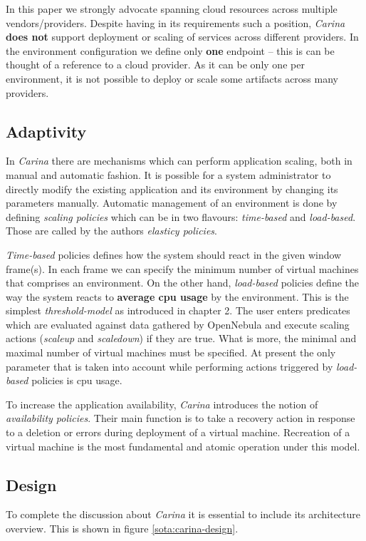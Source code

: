 In this paper we strongly advocate spanning cloud resources across multiple vendors/providers. Despite having in its requirements such a position, \emph{Carina} \textbf{does not} support deployment or scaling of services across different providers. In the environment configuration we define only \textbf{one} endpoint -- this is can be thought of a reference to a cloud provider. As it can be only one per environment, it is not possible to deploy or scale some artifacts across many providers.

\subsection{Adaptivity}
In \emph{Carina} there are mechanisms which can perform application scaling, both in manual and automatic fashion. It is possible for a system administrator to directly modify the existing application and its environment by changing its parameters manually. Automatic management of an environment is done by defining \emph{scaling policies} which can be in two flavours: \emph{time-based} and \emph{load-based}. Those are called by the authors \emph{elasticy policies}.

\emph{Time-based} policies defines how the system should react in the given window frame(s). In each frame we can specify the minimum number of virtual machines that comprises an environment. On the other hand, \emph{load-based} policies define the way the system reacts to \textbf{average cpu usage} by the environment. This is the simplest \emph{threshold-model} as introduced in chapter 2. The user enters predicates which are evaluated against data gathered by OpenNebula and execute scaling actions  (\emph{scaleup} and \emph{scaledown}) if they are true. What is more, the minimal and maximal number of virtual machines must be specified. At present the only parameter that is taken into account while performing actions triggered by \emph{load-based} policies is cpu usage.

To increase the application availability, \emph{Carina} introduces the notion of \emph{availability policies}. Their main function is to take a recovery action in response to a deletion or errors during deployment of a virtual machine. Recreation of a virtual machine is the most fundamental and atomic operation under this model.

\subsection{Design}
To complete the discussion about \emph{Carina} it is essential to include its architecture overview. This is shown in figure \ref{sota:carina-design}.

